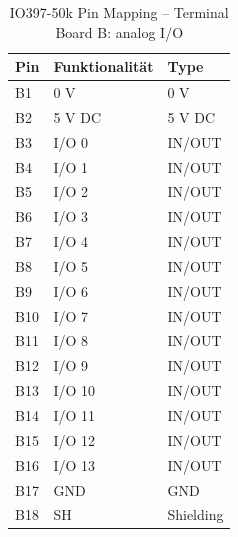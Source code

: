 \pagebreak[1]
\begin{table}[!ht]
	\centering
	\caption{IO397-50k Pin Mapping – Terminal Board B: analog I/O \cite{speedgoat:IO397_50k}}
	\label{IO397_50k:tab:Board_B}
	\begin{tabular}{lll}
		\hline
		\textbf{Pin}             & \textbf{Funktionalität} & \textbf{Type} \\ \hline
		\multicolumn{1}{l|}{B1}  & 0 V                     & 0 V           \\
		\multicolumn{1}{l|}{B2}  & 5 V DC                  & 5 V DC        \\ \hline
		\multicolumn{1}{l|}{B3}  & I/O 0                   & IN/OUT        \\
		\multicolumn{1}{l|}{B4}  & I/O 1                   & IN/OUT        \\
		\multicolumn{1}{l|}{B5}  & I/O 2                   & IN/OUT        \\
		\multicolumn{1}{l|}{B6}  & I/O 3                   & IN/OUT        \\
		\multicolumn{1}{l|}{B7}  & I/O 4                   & IN/OUT        \\
		\multicolumn{1}{l|}{B8}  & I/O 5                   & IN/OUT        \\
		\multicolumn{1}{l|}{B9}  & I/O 6                   & IN/OUT        \\
		\multicolumn{1}{l|}{B10} & I/O 7                   & IN/OUT        \\
		\multicolumn{1}{l|}{B11} & I/O 8                   & IN/OUT        \\
		\multicolumn{1}{l|}{B12} & I/O 9                   & IN/OUT        \\
		\multicolumn{1}{l|}{B13} & I/O 10                  & IN/OUT        \\
		\multicolumn{1}{l|}{B14} & I/O 11                  & IN/OUT        \\
		\multicolumn{1}{l|}{B15} & I/O 12                  & IN/OUT        \\
		\multicolumn{1}{l|}{B16} & I/O 13                  & IN/OUT        \\\hline
		\multicolumn{1}{l|}{B17} & GND                     & GND           \\
		\multicolumn{1}{l|}{B18} & SH                      & Shielding     \\ \hline
	\end{tabular}
\end{table}
\pagebreak[4]

\newpage
